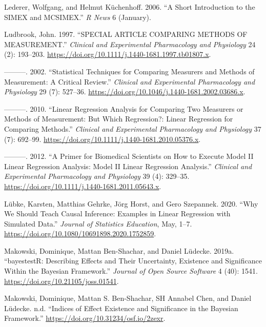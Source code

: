\documentclass[
]{book}
\newlength{\cslhangindent}
\newenvironment{cslreferences}%
  {\setlength{\parindent}{0pt}%
  \everypar{\setlength{\hangindent}{\cslhangindent}}\ignorespaces}%
  {\par}
\begin{document}
\begin{cslreferences}
\leavevmode\hypertarget{ref-LedererSimex2006}{}%
Lederer, Wolfgang, and Helmut Küchenhoff. 2006. ``A Short Introduction to the SIMEX and MCSIMEX.'' \emph{R News} 6 (January).

\leavevmode\hypertarget{ref-ludbrookSPECIALARTICLECOMPARING1997}{}%
Ludbrook, John. 1997. ``SPECIAL ARTICLE COMPARING METHODS OF MEASUREMENT.'' \emph{Clinical and Experimental Pharmacology and Physiology} 24 (2): 193--203. \url{https://doi.org/10.1111/j.1440-1681.1997.tb01807.x}.

\leavevmode\hypertarget{ref-ludbrookStatisticalTechniquesComparing2002}{}%
---------. 2002. ``Statistical Techniques for Comparing Measurers and Methods of Measurement: A Critical Review.'' \emph{Clinical and Experimental Pharmacology and Physiology} 29 (7): 527--36. \url{https://doi.org/10.1046/j.1440-1681.2002.03686.x}.

\leavevmode\hypertarget{ref-ludbrookLinearRegressionAnalysis2010}{}%
---------. 2010. ``Linear Regression Analysis for Comparing Two Measurers or Methods of Measurement: But Which Regression?: Linear Regression for Comparing Methods.'' \emph{Clinical and Experimental Pharmacology and Physiology} 37 (7): 692--99. \url{https://doi.org/10.1111/j.1440-1681.2010.05376.x}.

\leavevmode\hypertarget{ref-ludbrookPrimerBiomedicalScientists2012}{}%
---------. 2012. ``A Primer for Biomedical Scientists on How to Execute Model II Linear Regression Analysis: Model II Linear Regression Analysis.'' \emph{Clinical and Experimental Pharmacology and Physiology} 39 (4): 329--35. \url{https://doi.org/10.1111/j.1440-1681.2011.05643.x}.

\leavevmode\hypertarget{ref-lubkeWhyWeShould2020}{}%
Lübke, Karsten, Matthias Gehrke, Jörg Horst, and Gero Szepannek. 2020. ``Why We Should Teach Causal Inference: Examples in Linear Regression with Simulated Data.'' \emph{Journal of Statistics Education}, May, 1--7. \url{https://doi.org/10.1080/10691898.2020.1752859}.

\leavevmode\hypertarget{ref-makowskiBayestestRDescribingEffects2019}{}%
Makowski, Dominique, Mattan Ben-Shachar, and Daniel Lüdecke. 2019a. ``bayestestR: Describing Effects and Their Uncertainty, Existence and Significance Within the Bayesian Framework.'' \emph{Journal of Open Source Software} 4 (40): 1541. \url{https://doi.org/10.21105/joss.01541}.

\leavevmode\hypertarget{ref-makowskiIndicesEffectExistence}{}%
Makowski, Dominique, Mattan S. Ben-Shachar, SH Annabel Chen, and Daniel Lüdecke. n.d. ``Indices of Effect Existence and Significance in the Bayesian Framework.'' \url{https://doi.org/10.31234/osf.io/2zexr}.


\end{cslreferences}
\end{document}

